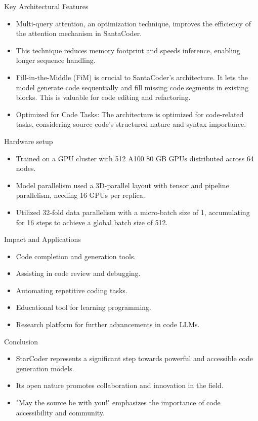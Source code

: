 \begin{frame}{Key Architectural Features}
\begin{itemize}
\item Multi-query attention, an optimization technique, improves the efficiency of the attention mechanism in SantaCoder.
\item This technique reduces memory footprint and speeds inference, enabling longer sequence handling.
\item Fill-in-the-Middle (FiM) is crucial to SantaCoder’s architecture. It lets the model generate code sequentially and fill missing code segments in existing blocks. This is valuable for code editing and refactoring.
\item Optimized for Code Tasks:
The architecture is optimized for code-related tasks, considering source code’s structured nature and syntax importance.
\end{itemize}
\end{frame}

\begin{frame}{Hardware setup}
\begin{itemize}
\item Trained on a GPU cluster with 512 A100 80 GB GPUs distributed across 64 nodes.
\item Model parallelism used a 3D-parallel layout with tensor and pipeline parallelism, needing 16 GPUs per replica.
\item Utilized 32-fold data parallelism with a micro-batch size of 1, accumulating for 16 steps to achieve a global batch size of 512.

\end{itemize}
\end{frame}
\begin{frame}{Impact and Applications}
    \begin{itemize}
        \item Code completion and generation tools.
        \item Assisting in code review and debugging.
        \item Automating repetitive coding tasks.
        \item Educational tool for learning programming.
        \item Research platform for further advancements in code LLMs.
    \end{itemize}
\end{frame}

\begin{frame}{Conclusion}
    \begin{itemize}
        \item StarCoder represents a significant step towards powerful and accessible code generation models.
        \item Its open nature promotes collaboration and innovation in the field.
        \item "May the source be with you!" emphasizes the importance of code accessibility and community.
    \end{itemize}
\end{frame}


